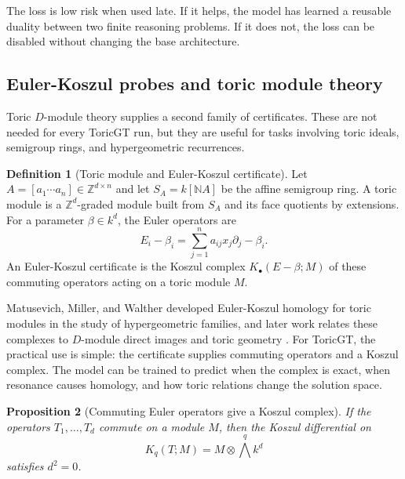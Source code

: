 \documentclass[11pt]{article}
\theoremstyle{definition}
\newtheorem{definition}{Definition}[section]
\theoremstyle{plain}
\newtheorem{proposition}[definition]{Proposition}
\theoremstyle{remark}
\numberwithin{equation}{section}
\newcommand{\Z}{\mathbb{Z}}
\newcommand{\N}{\mathbb{N}}
\begin{document}
The loss is low risk when used late.  If it helps, the model has learned a reusable duality between two finite reasoning problems.  If it does not, the loss can be disabled without changing the base architecture.

\subsection{Euler-Koszul probes and toric module theory}

Toric $D$-module theory supplies a second family of certificates.  These are not needed for every ToricGT run, but they are useful for tasks involving toric ideals, semigroup rings, and hypergeometric recurrences.

\begin{definition}[Toric module and Euler-Koszul certificate]\label{def:euler-koszul-cert}
Let $A=[a_1\cdots a_n]\in\Z^{d\times n}$ and let $S_A=k[\N A]$ be the affine semigroup ring.  A toric module is a $\Z^d$-graded module built from $S_A$ and its face quotients by extensions.  For a parameter $\beta\in k^d$, the Euler operators are
\begin{equation}
  E_i-\beta_i=\sum_{j=1}^n a_{ij}x_j\partial_j-\beta_i.
\end{equation}
An Euler-Koszul certificate is the Koszul complex $K_\bullet(E-\beta;M)$ of these commuting operators acting on a toric module $M$.
\end{definition}

Matusevich, Miller, and Walther developed Euler-Koszul homology for toric modules in the study of hypergeometric families, and later work relates these complexes to $D$-module direct images and toric geometry \cite{matusevich2005homological,schulze2009hypergeometric}.  For ToricGT, the practical use is simple: the certificate supplies commuting operators and a Koszul complex.  The model can be trained to predict when the complex is exact, when resonance causes homology, and how toric relations change the solution space.

\begin{proposition}[Commuting Euler operators give a Koszul complex]\label{prop:euler-koszul}
If the operators $T_1,\ldots,T_d$ commute on a module $M$, then the Koszul differential on
\begin{equation}
  K_q(T;M)=M\otimes \bigwedge^q k^d
\end{equation}
satisfies $d^2=0$.
\end{proposition}
\end{document}
